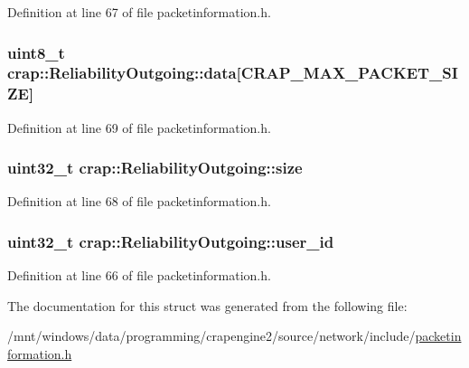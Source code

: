 Definition at line 67 of file packetinformation.\+h.

\hypertarget{structcrap_1_1_reliability_outgoing_a92f6942dcf7225db1c922dd43fae677e}{}
\subsubsection[{data}]{\setlength{\rightskip}{0pt plus 5cm}uint8\+\_\+t crap\+::\+Reliability\+Outgoing\+::data\mbox{[}{\bf C\+R\+A\+P\+\_\+\+M\+A\+X\+\_\+\+P\+A\+C\+K\+E\+T\+\_\+\+S\+I\+Z\+E}\mbox{]}}\label{structcrap_1_1_reliability_outgoing_a92f6942dcf7225db1c922dd43fae677e}


Definition at line 69 of file packetinformation.\+h.

\hypertarget{structcrap_1_1_reliability_outgoing_ac495bd52515b57b0b2186c8c15f4aed4}{}
\subsubsection[{size}]{\setlength{\rightskip}{0pt plus 5cm}uint32\+\_\+t crap\+::\+Reliability\+Outgoing\+::size}\label{structcrap_1_1_reliability_outgoing_ac495bd52515b57b0b2186c8c15f4aed4}


Definition at line 68 of file packetinformation.\+h.

\hypertarget{structcrap_1_1_reliability_outgoing_ab8d8d70315c7997f72bd8472c6ba1344}{}
\subsubsection[{user\+\_\+id}]{\setlength{\rightskip}{0pt plus 5cm}uint32\+\_\+t crap\+::\+Reliability\+Outgoing\+::user\+\_\+id}\label{structcrap_1_1_reliability_outgoing_ab8d8d70315c7997f72bd8472c6ba1344}


Definition at line 66 of file packetinformation.\+h.



The documentation for this struct was generated from the following file\+:\begin{DoxyCompactItemize}
\item 
/mnt/windows/data/programming/crapengine2/source/network/include/\hyperlink{packetinformation_8h}{packetinformation.\+h}\end{DoxyCompactItemize}
